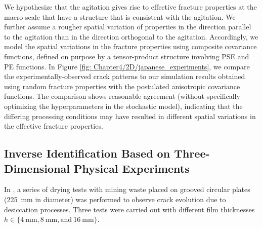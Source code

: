 We hypothesize that the agitation gives rise to effective fracture properties at the macro-scale that have a structure that is consistent with the agitation. We further assume a rougher spatial variation of properties in the direction parallel to the agitation than in the direction orthogonal to the agitation. Accordingly, we model the spatial variations in the fracture properties using composite covariance functions, defined on purpose by a tensor-product structure involving PSE and PE functions. In Figure \ref{fig: Chapter4/2D/japanese_experiments}, we compare the experimentally-observed crack patterns to our simulation results obtained using random fracture properties with the postulated anisotropic covariance functions. The comparison shows reasonable agreement (without specifically optimizing the  hyperparameters in the stochastic model), indicating that the differing processing conditions may have resulted in different spatial variations in the effective fracture properties.



\subsection{Inverse Identification Based on Three-Dimensional Physical Experiments}
\label{section: Chapter4/examples/3D}

In \citet{Rodriguez2006}, a series of drying tests with mining waste placed on grooved circular plates (\SI{225}{\milli\meter} in diameter) was performed to observe crack evolution due to desiccation processes. Three tests were carried out with different film thicknesses $h \in \{ \SI{4}{\milli\meter}, \SI{8}{\milli\meter}, \text{and}~\SI{16}{\milli\meter} \}$.

